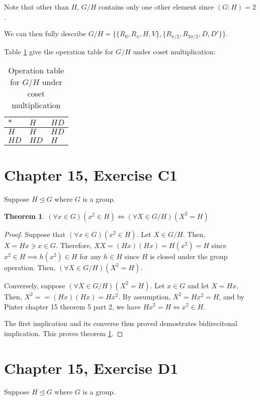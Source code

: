 \documentclass[12pt]{article}
\newtheorem{thm}{Theorem}
\begin{document}
Note that other than $H$, $G/H$ contains only one other element since $(G:H) = 2$.

We can then fully describe $G/H = \Big\{ \{ R_0, R_\pi, H, V \}, \{R_{\pi/2}, R_{3\pi/2}, D, D' \} \Big\}$.

Table \ref{t3} give the operation table for $G/H$ under coset multiplication:

\begin{table}[!ht]
	\begin{tabular}{l|ll}
		$*$ & $H$ & $HD$ \\ \hline
		$H$ & $H$ & $HD$ \\
		$HD$ & $HD$ & $H$
	\end{tabular}
	\centering
	\caption{Operation table for $G/H$ under coset multiplication}
	\label{t3}
\end{table}

\section{Chapter 15, Exercise C1}

Suppose $H \trianglelefteq G$ where $G$ is a group.

\begin{thm} \label{thm1}
	$(\forall x \in G)(x^2 \in H) \iff (\forall X \in G/H)(X^2 = H)$
\end{thm}

\begin{proof}
	Suppose that $(\forall x \in G)(x^2 \in H)$.
	Let $X \in G/H$. Then, $X = Hx \ni x \in G$.
	Therefore, $XX = (Hx)(Hx) = H(x^2) = H$
	since $x^2 \in H \implies h(x^2) \in H$ for any $h \in H$
	since $H$ is closed under the group operation.
	Then, $(\forall X \in G/H)(X^2 = H)$.

	Conversely, suppose $(\forall X \in G/H)(X^2 = H)$.
	Let $x \in G$ and let $X = Hx$.
	Then, $X^2 = = (Hx)(Hx) = Hx^2$.
	By assumption, $X^2 = Hx^2 = H$,
	and by Pinter chapter 15 theorem 5 part 2,
	we have $Hx^2 = H \iff x^2 \in H$.

	The first implication and its converse thus proved
	demostrates bidirecitonal implication.
	This proves theorem \ref{thm1}.
\end{proof}

\section{Chapter 15, Exercise D1}

Suppose $H \trianglelefteq G$ where $G$ is a group.
\end{document}
